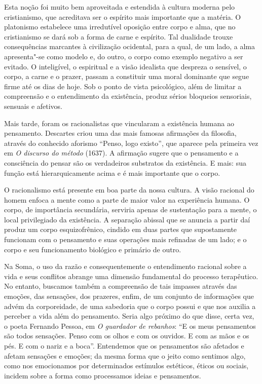 Esta noção foi muito bem aproveitada e estendida à cultura moderna pelo
cristianismo, que acreditava ser o espírito mais importante que a
matéria. O platonismo estabelece uma irredutível oposição entre corpo e
alma, que no cristianismo se dará sob a forma de carne e espírito. Tal
dualidade trouxe consequências marcantes à civilização ocidental, para a qual,
de um lado, a alma apresenta"-se como modelo e, do outro, o corpo como
exemplo negativo a ser evitado. O inteligível, o espiritual e a visão
idealista que despreza o sensível, o corpo, a carne e o prazer, passam a
constituir uma moral dominante que segue firme até os dias de hoje. Sob
o ponto de vista psicológico, além de limitar a compreensão e o
entendimento da existência, produz sérios bloqueios sensoriais, sensuais
e afetivos.

Mais tarde, foram os racionalistas que vincularam a existência humana ao
pensamento. Descartes criou uma das mais famosas afirmações da
filosofia, através do conhecido aforismo ``Penso, logo existo'', que
aparece pela primeira vez em \emph{O discurso do método} (1637). A
afirmação sugere que o pensamento e a consciência do pensar são os
verdadeiros substratos da existência. E mais: sua função está
hierarquicamente acima e é mais importante que o corpo.

O racionalismo está presente em boa parte da nossa cultura. A visão
racional do homem enfoca a mente como a parte de maior valor na
experiência humana. O corpo, de importância secundária, serviria apenas
de sustentação para a mente, o local privilegiado da existência. A
separação abissal que se anuncia a partir daí produz um corpo
esquizofrênico, cindido em duas partes que supostamente funcionam com o
pensamento e suas operações mais refinadas de um lado; e o corpo e seu
funcionamento biológico e primário de outro.

Na Soma, o uso da razão e consequentemente o entendimento racional sobre
a vida e seus conflitos abrange uma dimensão fundamental do processo
terapêutico. No entanto, buscamos também a compreensão de tais impasses
através das emoções, das sensações, dos prazeres, enfim, de um conjunto
de informações que advém da corporeidade, de uma sabedoria que o corpo
possui e que nos auxilia a perceber a vida além do pensamento. Seria
algo próximo do que disse, certa vez, o poeta Fernando Pessoa, em %
\emph{O guardador de rebanhos}: ``E os meus pensamentos são todos
sensações. Penso com os olhos e com os ouvidos. E com as mãos e os pés.
E com o nariz e a boca''. Entendemos que os pensamentos são afetados e
afetam sensações e emoções; da mesma forma que o jeito como sentimos
algo, como nos emocionamos por determinados estímulos estéticos, éticos
ou sociais, incidem sobre a forma como processamos ideias e pensamentos.

